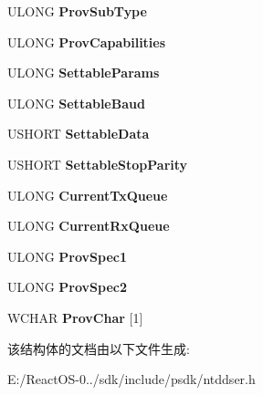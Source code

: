 \begin{DoxyCompactItemize}
U\+L\+O\+NG {\bfseries Prov\+Sub\+Type}
\item 
\mbox{\label{struct___s_e_r_i_a_l___c_o_m_m_p_r_o_p_afc2a4f2b03c7737214c285a30e6e12b9}} 
U\+L\+O\+NG {\bfseries Prov\+Capabilities}
\item 
\mbox{\label{struct___s_e_r_i_a_l___c_o_m_m_p_r_o_p_a3960176aa05cdbd3ea03028742d28f33}} 
U\+L\+O\+NG {\bfseries Settable\+Params}
\item 
\mbox{\label{struct___s_e_r_i_a_l___c_o_m_m_p_r_o_p_ad3b118b057ec1d2b64e48e030afc8772}} 
U\+L\+O\+NG {\bfseries Settable\+Baud}
\item 
\mbox{\label{struct___s_e_r_i_a_l___c_o_m_m_p_r_o_p_a1bf6e34c3b4be37105ad3aea546984f5}} 
U\+S\+H\+O\+RT {\bfseries Settable\+Data}
\item 
\mbox{\label{struct___s_e_r_i_a_l___c_o_m_m_p_r_o_p_a5e7fd27862205fd61e4a6dd652d2eb45}} 
U\+S\+H\+O\+RT {\bfseries Settable\+Stop\+Parity}
\item 
\mbox{\label{struct___s_e_r_i_a_l___c_o_m_m_p_r_o_p_a99c303171416de330b7084dea1a50867}} 
U\+L\+O\+NG {\bfseries Current\+Tx\+Queue}
\item 
\mbox{\label{struct___s_e_r_i_a_l___c_o_m_m_p_r_o_p_ab3e7bdb5d0a21e5b2c1ec61daf11adf3}} 
U\+L\+O\+NG {\bfseries Current\+Rx\+Queue}
\item 
\mbox{\label{struct___s_e_r_i_a_l___c_o_m_m_p_r_o_p_a5116ea9d2e66f7164f149ca749c11a49}} 
U\+L\+O\+NG {\bfseries Prov\+Spec1}
\item 
\mbox{\label{struct___s_e_r_i_a_l___c_o_m_m_p_r_o_p_a3971e399d6727e6fe7b424b34d867e14}} 
U\+L\+O\+NG {\bfseries Prov\+Spec2}
\item 
\mbox{\label{struct___s_e_r_i_a_l___c_o_m_m_p_r_o_p_a9490243dfbbe2534e5923aae0a2d881b}} 
W\+C\+H\+AR {\bfseries Prov\+Char} \mbox{[}1\mbox{]}
\end{DoxyCompactItemize}


该结构体的文档由以下文件生成\+:\begin{DoxyCompactItemize}
\item 
E\+:/\+React\+O\+S-\/0../sdk/include/psdk/ntddser.\+h\end{DoxyCompactItemize}
